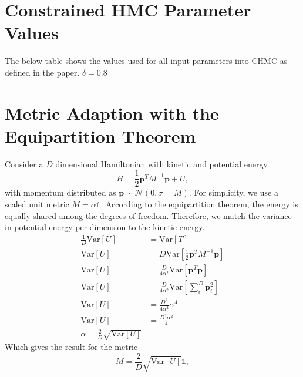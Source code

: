 \documentclass[11pt]{article}
\begin{document}
    \appendix
    \section{Constrained HMC Parameter Values}\label{sec:param_table}
    The below table shows the values used for all input parameters into CHMC as defined in the paper.
    $\delta = 0.8$~\cite{MCMChamiltonian}

    \section{Metric Adaption with the Equipartition Theorem}\label{sec:metric_derivation}
    Consider a $D$ dimensional Hamiltonian with kinetic and potential energy
    \begin{equation}\label{eq:hamiltonian_appendix}
        H = \frac{1}{2} \mathbf{p}^T M^{-1} \mathbf{p} + U,
    \end{equation}
    with momentum distributed as $\mathbf{p} \sim \mathcal{N}(0, \sigma=M)$.
    For simplicity, we use a scaled unit metric $M = \alpha \mathbb{1}$.
    According to the equipartition theorem, the energy is equally shared among the degrees of freedom.
    Therefore, we match the variance in potential energy per dimension to the kinetic energy.
    \begin{equation}\label{eq:var_matching}
    \begin{aligned}
        \frac{1}{D} \mathrm{Var}[U] &= \mathrm{Var}[T]  \\
        \mathrm{Var}[U] &= D\mathrm{Var}\left[\frac{1}{2} \mathbf{p}^T M^{-1} \mathbf{p}\right]  \\
        \mathrm{Var}[U] &= \frac{D}{4 \alpha^2} \mathrm{Var}\left[\mathbf{p}^T \mathbf{p}\right] \\
        \mathrm{Var}[U] &= \frac{D}{4 \alpha^2} \mathrm{Var}\left[\sum_i^D{\mathbf{p}_i^2}\right] \\
        \mathrm{Var}[U] &= \frac{D^2}{4 \alpha^2} \alpha^4 \\
        \mathrm{Var}[U] &= \frac{D^2 \alpha^2}{4} \\
        \alpha = \frac{2}{D} \sqrt{\mathrm{Var}[U]}
    \end{aligned}
    \end{equation}
    Which gives the result for the metric
    \begin{equation}\label{eq:metric_adaption_appendix}
        M = \frac{2}{D} \sqrt{\mathrm{Var}[U]} \mathbb{1},
    \end{equation}
\end{document}
